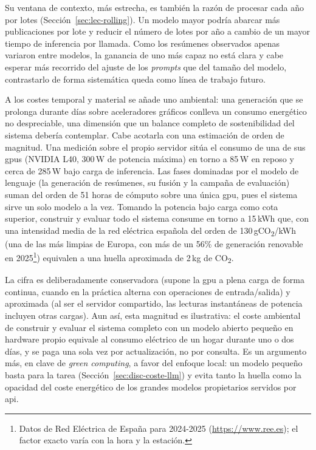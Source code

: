 Su ventana de contexto, más estrecha, es también la razón de procesar cada año por lotes (Sección~\ref{sec:lec-rolling}).
Un modelo mayor podría abarcar más publicaciones por lote y reducir el número de lotes por año a cambio de un mayor tiempo de inferencia por llamada.
Como los resúmenes observados apenas variaron entre modelos, la ganancia de uno más capaz no está clara y cabe esperar más recorrido del ajuste de los \emph{prompts} que del tamaño del modelo, contrastarlo de forma sistemática queda como línea de trabajo futuro.

A los costes temporal y material se añade uno ambiental: una generación que se prolonga durante días sobre aceleradores gráficos conlleva un consumo energético no despreciable, una dimensión que un balance completo de sostenibilidad del sistema debería contemplar.
Cabe acotarla con una estimación de orden de magnitud.
Una medición sobre el propio servidor sitúa el consumo de una de sus \glspl{gpu} (NVIDIA L40, 300\,W de potencia máxima) en torno a 85\,W en reposo y cerca de 285\,W bajo carga de inferencia.
Las fases dominadas por el modelo de lenguaje (la generación de resúmenes, su fusión y la campaña de evaluación) suman del orden de 51 horas de cómputo sobre una única \gls{gpu}, pues el sistema sirve un solo modelo a la vez.
Tomando la potencia bajo carga como cota superior, construir y evaluar todo el sistema consume en torno a 15\,kWh que, con una intensidad media de la red eléctrica española del orden de 130\,gCO\textsubscript{2}/kWh (una de las más limpias de Europa, con más de un 56\% de generación renovable en 2025\footnote{Datos de Red Eléctrica de España para 2024-2025 (\url{https://www.ree.es}); el factor exacto varía con la hora y la estación.}) equivalen a una huella aproximada de 2\,kg de CO\textsubscript{2}.

La cifra es deliberadamente conservadora (supone la \gls{gpu} a plena carga de forma continua, cuando en la práctica alterna con operaciones de entrada/salida) y aproximada (al ser el servidor compartido, las lecturas instantáneas de potencia incluyen otras cargas).
Aun así, esta magnitud es ilustrativa: el coste ambiental de construir y evaluar el sistema completo con un modelo abierto pequeño en hardware propio equivale al consumo eléctrico de un hogar durante uno o dos días, y se paga una sola vez por actualización, no por consulta.
Es un argumento más, en clave de \emph{green computing}, a favor del enfoque local: un modelo pequeño basta para la tarea (Sección~\ref{sec:disc-coste-llm}) y evita tanto la huella como la opacidad del coste energético de los grandes modelos propietarios servidos por \gls{api}.

